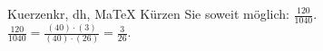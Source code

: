 \begin{MAufgabe}{Kuerzen}{kr, dh, MaTeX}
K\"urzen Sie soweit m\"oglich: $\frac{120}{1040}$.\\ 
\ifLsg\MLoesung
\quad $\frac{120}{1040}=\frac{(40)\cdot(3)}{(40)\cdot(26)}=\frac{3}{26}$.\else\relax\fi
 \end{MAufgabe}